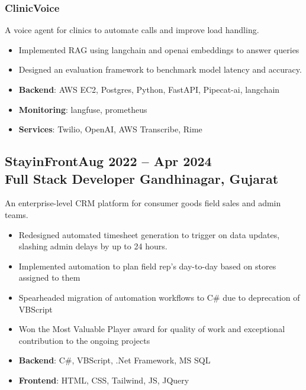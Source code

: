 \documentclass[a4paper]{article}
\newcommand{\experiencetitle}[4]{\subsection{\texorpdfstring{#1\hfill \small \textmd{#4} \\
	\textmd{#3} \hfill \textmd{#2}}{#1}}}
\begin{document}
\subsubsection{ClinicVoice}
A voice agent for clinics to automate calls and improve load handling.
\begin{itemize}
	\item Implemented RAG using langchain and openai embeddings to answer queries
	\item Designed an evaluation framework to benchmark model latency and accuracy.
	\item \textbf{Backend}: AWS EC2, Postgres, Python, FastAPI, Pipecat-ai, langchain
	\item \textbf{Monitoring}: langfuse, prometheus
	\item \textbf{Services}: Twilio, OpenAI, AWS Transcribe, Rime
\end{itemize}


\experiencetitle{StayinFront}{Gandhinagar, Gujarat}{Full Stack Developer}{Aug 2022 -- Apr 2024}
An enterprise-level CRM platform for consumer goods field sales and admin teams.
\begin{itemize}
	\item Redesigned automated timesheet generation to trigger on data updates, slashing admin delays by up to 24 hours.
	\item Implemented automation to plan field rep's day-to-day based on stores assigned to them
	\item Spearheaded migration of automation workflows to C\# due to deprecation of VBScript
	\item Won the Most Valuable Player award for quality of work and exceptional contribution to the ongoing projects
	\item \textbf{Backend}: C\#, VBScript, .Net Framework, MS SQL
	\item \textbf{Frontend}: HTML, CSS, Tailwind, JS, JQuery
\end{itemize}


\end{document}
